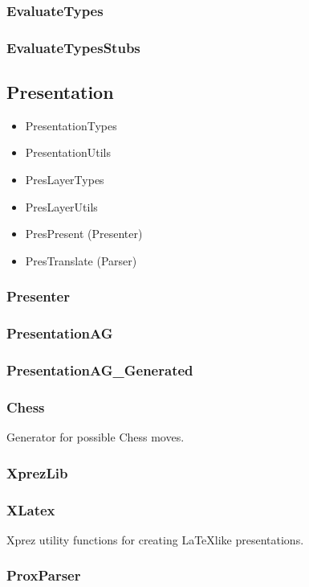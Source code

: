 \documentclass[]{article}
\begin{document}
\subsubsection{EvaluateTypes}
\subsubsection{EvaluateTypesStubs}


\subsection{Presentation}
\begin{itemize}
\item PresentationTypes
\item PresentationUtils
\item PresLayerTypes
\item PresLayerUtils
\item PresPresent (Presenter)
\item PresTranslate (Parser)
\end{itemize}

\subsubsection{Presenter}

\subsubsection{PresentationAG}
\subsubsection{PresentationAG\_Generated}
\subsubsection{Chess}

Generator for possible Chess moves.

\subsubsection{XprezLib}
\subsubsection{XLatex}

Xprez utility functions for creating \LaTeX like presentations.


\subsubsection{ProxParser}
\end{document}
